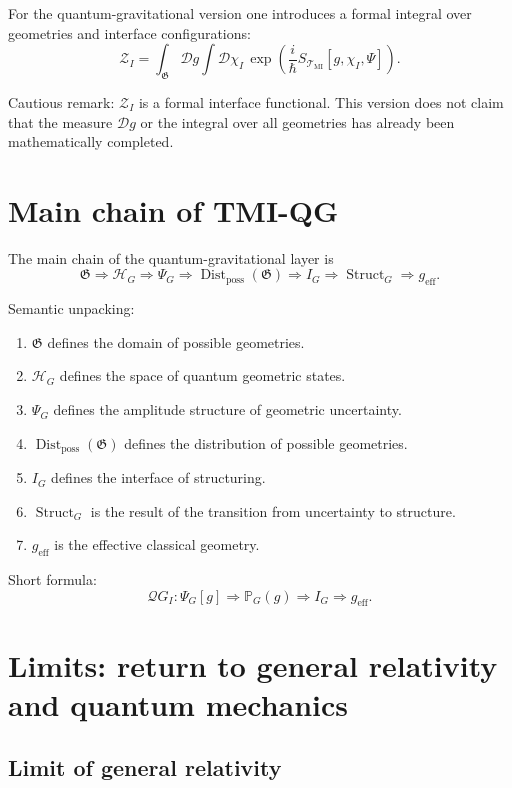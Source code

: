 \documentclass[12pt,a4paper]{article}
\DeclareMathOperator{\Struct}{Struct}
\DeclareMathOperator{\Dist}{Dist}
\newcommand{\TMI}{\mathcal T_{\mathrm{MI}}}
\newcommand{\QGI}{\mathcal QG_I}
\newcommand{\Gspace}{\mathfrak G}
\newcommand{\Hilb}{\mathcal H}
\newcommand{\Prob}{\mathbb P}
\newcommand{\Eff}{\mathrm{eff}}
\newcommand{\D}{\mathcal D}
\begin{document}
For the quantum-gravitational version one introduces a formal integral over geometries and interface configurations:
\[
\boxed{
\mathcal Z_I
=
\int_{\Gspace}\D g
\int \D\chi_I\,
\exp\left(\frac{i}{\hbar}S_{\TMI}[g,\chi_I,\Psi]\right).
}
\]

Cautious remark: $\mathcal Z_I$ is a formal interface functional. This version does not claim that the measure $\D g$ or the integral over all geometries has already been mathematically completed.

\section{Main chain of TMI-QG}

The main chain of the quantum-gravitational layer is
\[
\boxed{
\Gspace
\Rightarrow
\Hilb_G
\Rightarrow
\Psi_G
\Rightarrow
\Dist_{\mathrm{poss}}(\Gspace)
\Rightarrow
I_G
\Rightarrow
\Struct_G
\Rightarrow
 g_{\Eff}.
}
\]

Semantic unpacking:
\begin{enumerate}[leftmargin=2em]
    \item $\Gspace$ defines the domain of possible geometries.
    \item $\Hilb_G$ defines the space of quantum geometric states.
    \item $\Psi_G$ defines the amplitude structure of geometric uncertainty.
    \item $\Dist_{\mathrm{poss}}(\Gspace)$ defines the distribution of possible geometries.
    \item $I_G$ defines the interface of structuring.
    \item $\Struct_G$ is the result of the transition from uncertainty to structure.
    \item $g_{\Eff}$ is the effective classical geometry.
\end{enumerate}

Short formula:
\[
\boxed{
\QGI:
\Psi_G[g]
\Rightarrow
\Prob_G(g)
\Rightarrow
I_G
\Rightarrow
 g_{\Eff}.
}
\]

\section{Limits: return to general relativity and quantum mechanics}

\subsection{Limit of general relativity}
\end{document}
